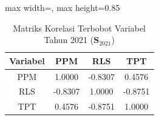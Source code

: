 \begin{table}[H]
\centering
\caption{Matriks Korelasi Terbobot Variabel Tahun 2021 ($\mathbf{S}_{2021}$)} \makeatletter{}\makeatother
\begin{adjustbox}{max width=\textwidth, max height=0.85\textheight}
\begin{tabular}{|c|c|c|c|}
\hline
\textbf{Variabel} & \textbf{PPM} & \textbf{RLS} & \textbf{TPT} \\
\hline
PPM & 1.0000 & -0.8307 & 0.4576 \\
RLS & -0.8307 & 1.0000 & -0.8751 \\
TPT & 0.4576 & -0.8751 & 1.0000 \\
\hline
\end{tabular}
\end{adjustbox}
\end{table}